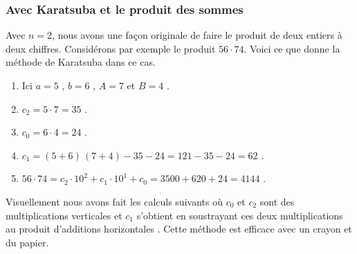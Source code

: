 \subsubsection{Avec Karatsuba et le produit des sommes}

Avec $n = 2$, nous avons une façon originale de faire le produit de deux entiers à deux chiffres. Considérons par exemple le produit $56 \cdot 74$. Voici ce que donne la méthode de Karatsuba dans ce cas.
	
\begin{enumerate}
	\item Ici $a = 5$ , $b = 6$ , $A = 7$ et $B = 4$ .

	\item $c_2 = 5 \cdot 7 = 35$ .

	\item $c_0 = 6 \cdot 4 = 24$ .

	\item $c_1 = (5 + 6) \, (7 + 4) - 35 - 24 = 121 - 35 - 24 = 62$ .

	\item $56 \cdot 74 = c_2 \cdot 10^2 + c_1 \cdot 10^1 + c_0 = 3500 + 620 + 24 = 4144$ .
\end{enumerate}
	
\medskip
	
Visuellement nous avons fait les calculs suivants où $c_0$ et $c_2$ sont des multiplications \og verticales \fg{} et $c_1$ s'obtient en soustrayant ces deux multiplications au produit \og d'additions horizontales \fg{}.
Cette méthode est efficace avec un crayon et du papier.
	
